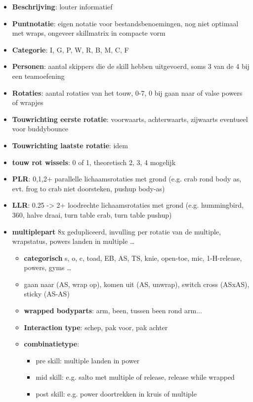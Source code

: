 \begin{itemize}
    \item \textbf{Beschrijving}: louter informatief
    \item \textbf{Puntnotatie}: eigen notatie voor bestandsbenoemingen, nog niet optimaal met wraps, ongeveer skillmatrix in compacte vorm
    \item \textbf{Categorie}: I, G, P, W, R, B, M, C, F
    \item \textbf{Personen}: aantal skippers die de skill hebben uitgevoerd, soms 3 van de 4 bij een teamoefening
    \item \textbf{Rotaties}: aantal rotaties van het touw, 0-7, 0 bij gaan naar of valse powers of wrapjes
    \item \textbf{Touwrichting eerste rotatie}: voorwaarts, achterwaarts, zijwaarts eventueel voor buddybounce
    \item \textbf{Touwrichting laatste rotatie}: idem
    \item \textbf{touw rot wissels}: 0 of 1, theoretisch 2, 3, 4 mogelijk
    \item \textbf{PLR}: 0,1,2+ parallelle lichaamsrotaties met grond (e.g. crab rond body as, evt. frog to crab niet doorsteken, pushup body-as)
    \item \textbf{LLR}: 0.25 -> 2+ loodrechte lichaamsrotaties met grond (e.g. hummingbird, 360, halve draai, turn table crab, turn table pushup)
    \item \textbf{multiplepart} 8x gedupliceerd, invulling per rotatie van de multiple, wrapstatus, powers landen in multiple \dots
    \begin{itemize}
        \item \textbf{categorisch} s, o, c, toad, EB, AS, TS, knie, open-toe, mic, 1-H-release, powers, gyms \dots
        \item gaan naar (AS, wrap op), komen uit (AS, unwrap), switch cross (ASxAS), sticky (AS-AS)
        \item \textbf{wrapped bodyparts}: arm, been, tussen been rond arm...
        \item \textbf{Interaction type}: schep, pak voor, pak achter
        \item \textbf{combinatietype}:
        \begin{itemize}
            \item pre skill: multiple landen in power
            \item mid skill: e.g. salto met multiple of release, release while wrapped
            \item post skill: e.g. power doortrekken in kruis of multiple
        \end{itemize}
    \end{itemize}
\end{itemize}

